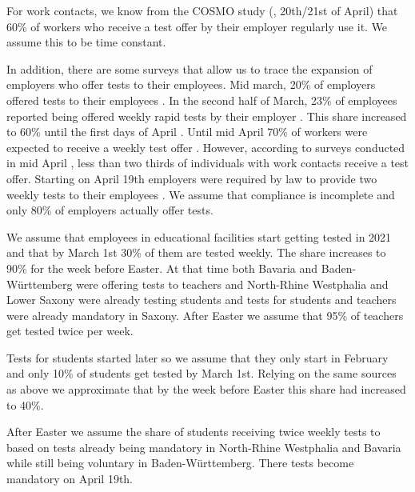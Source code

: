 
For work contacts, we know from the COSMO study (\cite{Betsch2021}, 20th/21st of April)
that 60\% of workers who receive a test offer by their employer regularly use it. We
assume this to be time constant.

In addition, there are some surveys that allow us to trace the expansion of employers
who offer tests to their employees. Mid march, 20\% of employers offered tests to their
employees \citep{DIHK2021}. In the second half of March, 23\% of employees reported
being offered weekly rapid tests by their employer \citep{Ahlers2021}. This share
increased to 60\% until the first days of April \cite{ZDF2021}. Until mid April 70\% of
workers were expected to receive a weekly test offer \citep{AerzteZeitung2021}. However,
according to surveys conducted in mid April \citep{Betsch2021}, less than two thirds of
individuals with work contacts receive a test offer. Starting on April 19th employers
were required by law to provide two weekly tests to their employees
\citep{Bundesanzeiger2021}. We assume that compliance is incomplete and only 80\% of
employers actually offer tests.



We assume that employees in educational facilities start getting tested in 2021 and that
by March 1st 30\% of them are tested weekly. The share increases to 90\% for the week
before Easter. At that time both Bavaria and Baden-Württemberg were offering tests to
teachers and North-Rhine Westphalia and Lower Saxony were already testing students and
tests for students and teachers were already mandatory in Saxony. After Easter we assume
that 95\% of teachers get tested twice per week.

Tests for students started later so we assume that they only start in February and only
10\% of students get tested by March 1st. Relying on the same sources as above we
approximate that by the week before Easter this share had increased to 40\%.

After Easter we assume the share of students receiving twice weekly tests to based on
tests already being mandatory in North-Rhine Westphalia and Bavaria while still being
voluntary in Baden-Württemberg. There tests become mandatory on April 19th.








